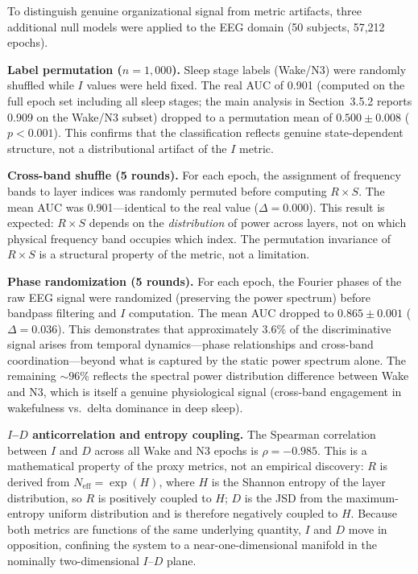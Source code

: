 \documentclass[aip,cha,reprint,amsmath,amssymb,final,floatfix]{revtex4-2}
\begin{document}
To distinguish genuine organizational signal from metric artifacts, three additional null models were applied to the EEG domain (50 subjects, 57,212 epochs).

\textbf{Label permutation ($n = 1{,}000$).} Sleep stage labels (Wake/N3) were randomly shuffled while $I$ values were held fixed. The real AUC of 0.901 (computed on the full epoch set including all sleep stages; the main analysis in Section~3.5.2 reports 0.909 on the Wake/N3 subset) dropped to a permutation mean of $0.500 \pm 0.008$ ($p < 0.001$). This confirms that the classification reflects genuine state-dependent structure, not a distributional artifact of the $I$ metric.

\textbf{Cross-band shuffle (5 rounds).} For each epoch, the assignment of frequency bands to layer indices was randomly permuted before computing $R \times S$. The mean AUC was 0.901---identical to the real value ($\Delta = 0.000$). This result is expected: $R \times S$ depends on the \emph{distribution} of power across layers, not on which physical frequency band occupies which index. The permutation invariance of $R \times S$ is a structural property of the metric, not a limitation.

\textbf{Phase randomization (5 rounds).} For each epoch, the Fourier phases of the raw EEG signal were randomized (preserving the power spectrum) before bandpass filtering and $I$ computation. The mean AUC dropped to $0.865 \pm 0.001$ ($\Delta = 0.036$). This demonstrates that approximately 3.6\% of the discriminative signal arises from temporal dynamics---phase relationships and cross-band coordination---beyond what is captured by the static power spectrum alone. The remaining ${\sim}96$\% reflects the spectral power distribution difference between Wake and N3, which is itself a genuine physiological signal (cross-band engagement in wakefulness vs.\ delta dominance in deep sleep).

\textbf{$I$--$D$ anticorrelation and entropy coupling.} The Spearman correlation between $I$ and $D$ across all Wake and N3 epochs is $\rho = -0.985$. This is a mathematical property of the proxy metrics, not an empirical discovery: $R$ is derived from $N_{\text{eff}} = \exp(H)$, where $H$ is the Shannon entropy of the layer distribution, so $R$ is positively coupled to $H$; $D$ is the JSD from the maximum-entropy uniform distribution and is therefore negatively coupled to $H$. Because both metrics are functions of the same underlying quantity, $I$ and $D$ move in opposition, confining the system to a near-one-dimensional manifold in the nominally two-dimensional $I$--$D$ plane.
\end{document}
